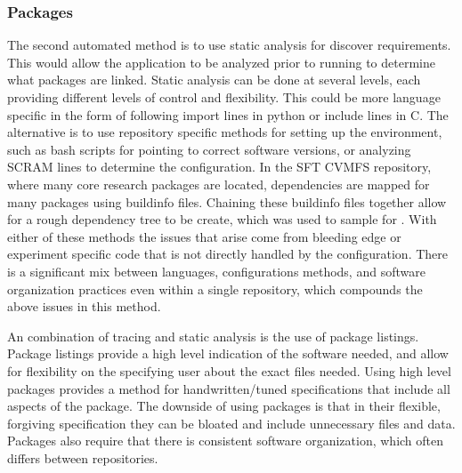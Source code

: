 \documentclass[sigconf]{acmart}
\begin{document}
\subsubsection{Packages}
The second automated method is to use static
analysis for discover requirements.
This would allow the application to be analyzed
prior to running to determine what packages are
linked.
Static analysis can be done at several levels,
each providing different levels of control 
and flexibility.
This could be more language specific in the 
form of following import lines in python or
include lines in C.
The alternative is to use repository specific 
methods for setting up the environment,
such as bash scripts for pointing to correct 
software versions, or 
analyzing SCRAM\cite{DBLP:journals/corr/cs-OH-0306014} lines
to determine the configuration.
In the SFT CVMFS repository, where many core research packages are located,
dependencies are mapped for many packages using buildinfo files.
Chaining these buildinfo files together allow for a rough dependency
tree to be create, which was used to sample for .
With either of these methods the issues
that arise come from bleeding edge or
experiment specific code that is not directly
handled by the configuration.
There is a significant mix between languages,
configurations methods, and software organization
practices even within a single repository,
which compounds the above issues in this method.

An combination of tracing and static analysis is the
use of package listings. 
Package listings provide a high level indication
of the software needed, and allow for 
flexibility on the specifying user about the
exact files needed.
Using high level packages provides a method
for handwritten/tuned specifications that 
include all aspects of the package.
The downside of using packages is that in
their flexible, forgiving specification
they can be bloated and include unnecessary
files and data.
Packages also require that there is consistent
software organization, which often differs
between repositories.
\end{document}

